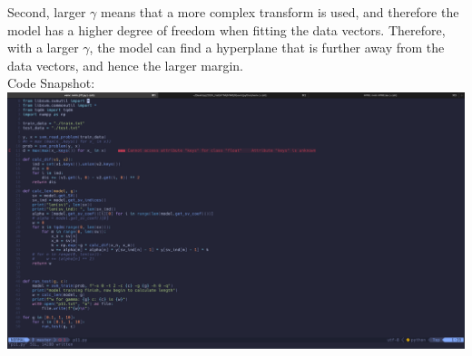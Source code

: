 \documentclass[11pt]{article}
\theoremstyle{definition}
\begin{document}
Second, larger $\gamma$ means that a more complex transform is used, and therefore the model has a higher degree of freedom when fitting the data vectors. Therefore, with a larger $\gamma$, the model can find a hyperplane that is further away from the data vectors, and hence the larger margin. \\
\newpage
Code Snapshot: \\
\includegraphics[width = \textwidth]{p11.png} \\
\newpage
\end{document}
